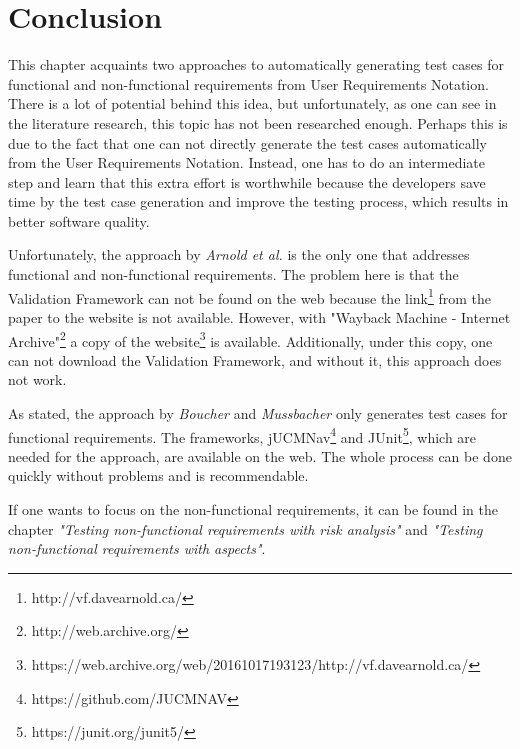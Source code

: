 \section{Conclusion}

This chapter acquaints two approaches to automatically generating test cases for functional and non-functional requirements from User Requirements Notation. There is a lot of potential behind this idea, but unfortunately, as one can see in the literature research, this topic has not been researched enough. Perhaps this is due to the fact that one can not directly generate the test cases automatically from the User Requirements Notation. Instead, one has to do an intermediate step and learn that this extra effort is worthwhile because the developers save time by the test case generation and improve the testing process, which results in better software quality. 

Unfortunately, the approach by \textit{Arnold et al.} is the only one that addresses functional and non-functional requirements. The problem here is that the Validation Framework can not be found on the web because the link\footnote{http://vf.davearnold.ca/} from the paper to the website is not available. However, with "Wayback Machine - Internet Archive"\footnote{http://web.archive.org/} a copy of the website\footnote{https://web.archive.org/web/20161017193123/http://vf.davearnold.ca/} is available. Additionally, under this copy, one can not download the Validation Framework, and without it, this approach does not work.  

As stated, the approach by \textit{Boucher} and \textit{Mussbacher} only generates test cases for functional requirements. The frameworks, jUCMNav\footnote{https://github.com/JUCMNAV} and JUnit\footnote{https://junit.org/junit5/}, which are needed for the approach, are available on the web. The whole process can be done quickly without problems and is recommendable.

If one wants to focus on the non-functional requirements, it can be found in the chapter \textit{"Testing non-functional requirements with risk analysis"} and \textit{"Testing non-functional requirements with aspects"}.

